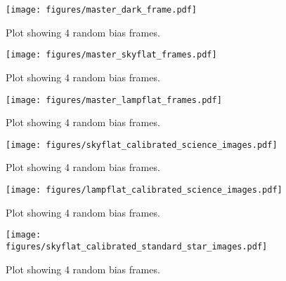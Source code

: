 \documentclass{aastex631}
\begin{document}
\begin{figure}[ht!]
    \begin{centering}
        \texttt{[image: figures/master\_dark\_frame.pdf]}
        \caption{
            Plot showing 4 random bias frames.
        }
        \label{fig:master_dark}
    \end{centering}
\end{figure}

\begin{figure}[ht!]
    \begin{centering}
        \texttt{[image: figures/master\_skyflat\_frames.pdf]}
        \caption{
            Plot showing 4 random bias frames.
        }
        \label{fig:master_dark}
    \end{centering}
\end{figure}

\begin{figure}[ht!]
    \begin{centering}
        \texttt{[image: figures/master\_lampflat\_frames.pdf]}
        \caption{
            Plot showing 4 random bias frames.
        }
        \label{fig:master_dark}
    \end{centering}
\end{figure}

\begin{figure}[ht!]
    \begin{centering}
        \texttt{[image: figures/skyflat\_calibrated\_science\_images.pdf]}
        \caption{
            Plot showing 4 random bias frames.
        }
        \label{fig:master_dark}
    \end{centering}
\end{figure}

\begin{figure}[ht!]
    \begin{centering}
        \texttt{[image: figures/lampflat\_calibrated\_science\_images.pdf]}
        \caption{
            Plot showing 4 random bias frames.
        }
        \label{fig:master_dark}
    \end{centering}
\end{figure}

\begin{figure}[ht!]
    \begin{centering}
        \texttt{[image: figures/skyflat\_calibrated\_standard\_star\_images.pdf]}
        \caption{
            Plot showing 4 random bias frames.
        }
        \label{fig:master_dark}
    \end{centering}
\end{figure}
\end{document}
